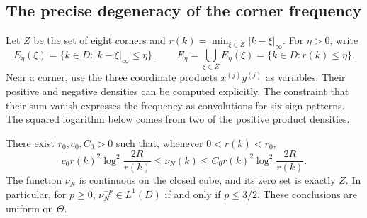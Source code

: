 \subsection{The precise degeneracy of the corner frequency}

Let $Z$ be the set of eight corners and
$r(k)=\min_{\xi\in Z}|k-\xi|_\infty$. For $\eta>0$, write
\[
 E_\eta(\xi)=\{k\in D:|k-\xi|_\infty\le\eta\},\qquad
 E_\eta=\bigcup_{\xi\in Z}E_\eta(\xi)=\{k\in D:r(k)\le\eta\}.
\]
Near a corner, use the three coordinate products $x^{(j)}y^{(j)}$
as variables. Their positive and negative densities can be computed
explicitly. The constraint that their sum vanish expresses the frequency
as convolutions for six sign patterns. The squared logarithm below comes
from two of the positive product densities.

\begin{proposition}\label{geom:frequency}
There exist $r_0,c_0,C_0>0$ such that, whenever $0<r(k)<r_0$,
\begin{equation}\label{geom:frequencyestimate}
 c_0r(k)^2\log^2\frac{2R}{r(k)}
 \le\nu_N(k)\le C_0r(k)^2\log^2\frac{2R}{r(k)}.
\end{equation}
The function $\nu_N$ is continuous on the closed cube, and its zero set
is exactly $Z$. In particular, for $p\ge0$,
$\nu_N^{-p}\in L^1(D)$ if and only if $p\le3/2$.
These conclusions are uniform on $\Theta$.
\end{proposition}
